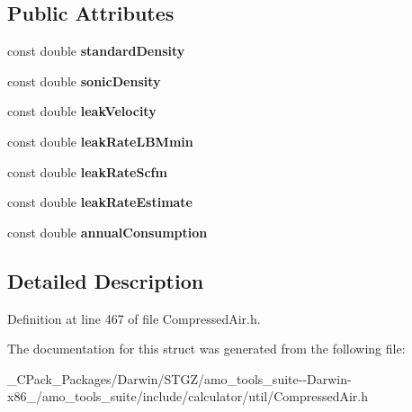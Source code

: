 \subsection*{Public Attributes}
\begin{DoxyCompactItemize}
\item 
\mbox{\label{struct_orifice_method_1_1_output_af3ebf98c7002cd54fb239ad5f88559c8}} 
const double {\bfseries standard\+Density}
\item 
\mbox{\label{struct_orifice_method_1_1_output_a64f01244faa0493a919870a4cec05030}} 
const double {\bfseries sonic\+Density}
\item 
\mbox{\label{struct_orifice_method_1_1_output_acf2b5ca2aa5fe21d4cfded631c42d47f}} 
const double {\bfseries leak\+Velocity}
\item 
\mbox{\label{struct_orifice_method_1_1_output_af8eb7eda690e54556746280b8a34b44d}} 
const double {\bfseries leak\+Rate\+L\+B\+Mmin}
\item 
\mbox{\label{struct_orifice_method_1_1_output_a0466cb626a4228ec8778cfc1cba94431}} 
const double {\bfseries leak\+Rate\+Scfm}
\item 
\mbox{\label{struct_orifice_method_1_1_output_ae2aa21d0f26d66819f2b78a776e26e2d}} 
const double {\bfseries leak\+Rate\+Estimate}
\item 
\mbox{\label{struct_orifice_method_1_1_output_a8881a1280a2dc1e8d926e8695514d6bc}} 
const double {\bfseries annual\+Consumption}
\end{DoxyCompactItemize}


\subsection{Detailed Description}


Definition at line 467 of file Compressed\+Air.\+h.



The documentation for this struct was generated from the following file\+:\begin{DoxyCompactItemize}
\item 
\+\_\+\+C\+Pack\+\_\+\+Packages/\+Darwin/\+S\+T\+G\+Z/amo\+\_\+tools\+\_\+suite-\/-\/\+Darwin-\/x86\+\_/amo\+\_\+tools\+\_\+suite/include/calculator/util/Compressed\+Air.\+h\end{DoxyCompactItemize}
